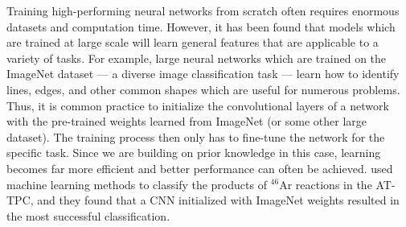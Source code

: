 \documentclass[review,number,sort&compress]{elsarticle}
\begin{document}




Training high-performing neural networks from scratch often requires enormous datasets and computation time. However, it has been found that models which are trained at large scale will learn general features that are applicable to a variety of tasks. For example, large neural networks which are trained on the ImageNet dataset \cite{Russakovsky2015} --- a diverse image classification task --- learn how to identify lines, edges, and other common shapes which are useful for numerous problems. Thus, it is common practice to initialize the convolutional layers of a network with the pre-trained weights learned from ImageNet (or some other large dataset). The training process then only has to fine-tune the network for the specific task. Since we are building on prior knowledge in this case, learning becomes far more efficient and better performance can often be achieved. \citet{Kuchera2019} used machine learning methods to classify the products of $^{46}$Ar reactions in the AT-TPC, and they found that a CNN initialized with ImageNet weights resulted in the most successful classification.
\end{document}
